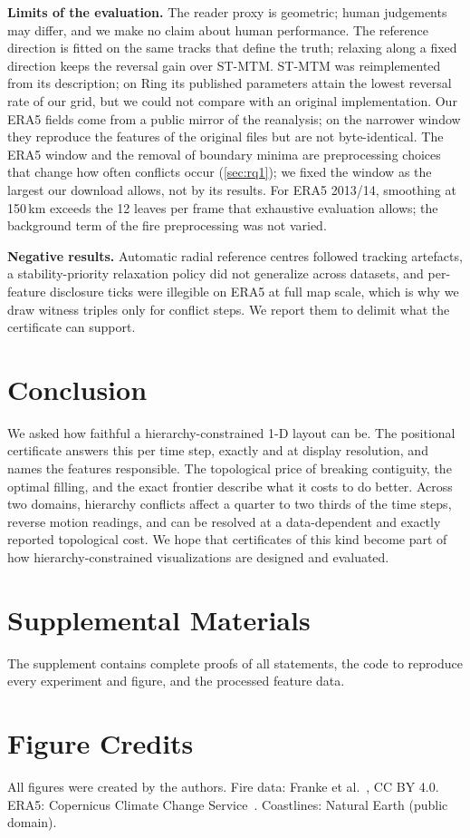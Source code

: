 \documentclass[review]{vgtc}                 %
\begin{document}
\textbf{Limits of the evaluation.} The reader proxy is geometric; human judgements may differ, and we make no claim about human performance. The reference direction is fitted on the same tracks that define the truth; relaxing along a fixed direction keeps the reversal gain over ST-MTM. ST-MTM was reimplemented from its description; on Ring its published parameters attain the lowest reversal rate of our grid, but we could not compare with an original implementation. Our ERA5 fields come from a public mirror of the reanalysis; on the narrower window they reproduce the features of the original files but are not byte-identical. The ERA5 window and the removal of boundary minima are preprocessing choices that change how often conflicts occur (\cref{sec:rq1}); we fixed the window as the largest our download allows, not by its results. For ERA5 2013/14, smoothing at 150\,km exceeds the 12 leaves per frame that exhaustive evaluation allows; the background term of the fire preprocessing was not varied.

\textbf{Negative results.} Automatic radial reference centres followed tracking artefacts, a stability-priority relaxation policy did not generalize across datasets, and per-feature disclosure ticks were illegible on ERA5 at full map scale, which is why we draw witness triples only for conflict steps. We report them to delimit what the certificate can support.

\section{Conclusion}
We asked how faithful a hierarchy-constrained 1-D layout can be. The positional certificate answers this per time step, exactly and at display resolution, and names the features responsible. The topological price of breaking contiguity, the optimal filling, and the exact frontier describe what it costs to do better. Across two domains, hierarchy conflicts affect a quarter to two thirds of the time steps, reverse motion readings, and can be resolved at a data-dependent and exactly reported topological cost. We hope that certificates of this kind become part of how hierarchy-constrained visualizations are designed and evaluated.

\section*{Supplemental Materials}
\label{sec:supplemental_materials}
The supplement contains complete proofs of all statements, the code to reproduce every experiment and figure, and the processed feature data. %

\section*{Figure Credits}
\label{sec:figure_credits}
All figures were created by the authors. Fire data: Franke et al.~\cite{Franke:2021:1DP}, CC BY 4.0. ERA5: Copernicus Climate Change Service~\cite{Hersbach:2020:ERA5}. Coastlines: Natural Earth (public domain).




\end{document}

